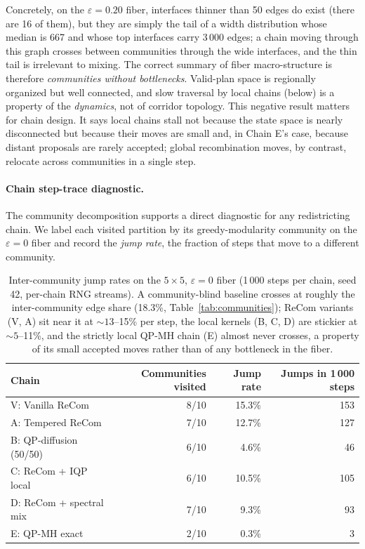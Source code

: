 \documentclass[11pt]{article}
\begin{document}
Concretely, on the $\varepsilon = 0.20$ fiber, interfaces thinner than
50 edges do exist (there are 16 of them), but they are simply the tail
of a width distribution whose median is 667 and whose top interfaces
carry $3\,000$ edges; a chain moving through this graph crosses
between communities through the wide interfaces, and the thin tail is
irrelevant to mixing. The correct summary of fiber macro-structure is
therefore \emph{communities without bottlenecks}. Valid-plan space is
regionally organized but well connected, and slow traversal by local
chains (below) is a property of the \emph{dynamics}, not of corridor
topology. This negative result matters for chain design. It says
local chains stall not because the state space is nearly disconnected
but because their moves are small and, in Chain E's case, because
distant proposals are rarely accepted; global recombination moves, by
contrast, relocate across communities in a single step.

\paragraph{Chain step-trace diagnostic.}\label{sec:fiber-trace}

The community decomposition supports a direct diagnostic for any
redistricting chain. We label each visited partition by its
greedy-modularity community on the $\varepsilon = 0$ fiber and record
the \emph{jump rate}, the fraction of steps that move to a
different community.

\begin{table}[htbp]
\centering
\small
\begin{tabular}{lrrr}
\toprule
Chain & Communities visited & Jump rate & Jumps in 1\,000 steps \\
\midrule
V: Vanilla ReCom        & 8/10 & 15.3\% & 153 \\
A: Tempered ReCom       & 7/10 & 12.7\% & 127 \\
B: QP-diffusion (50/50) & 6/10 & 4.6\%  & 46  \\
C: ReCom + IQP local    & 6/10 & 10.5\% & 105 \\
D: ReCom + spectral mix & 7/10 & 9.3\%  & 93  \\
E: QP-MH exact          & 2/10 & 0.3\%  & 3   \\
\bottomrule
\end{tabular}
\caption{Inter-community jump rates on the $5 \times 5$,
  $\varepsilon = 0$ fiber (1\,000 steps per chain, seed 42, per-chain
  RNG streams). A community-blind baseline crosses at roughly the
  inter-community edge share (18.3\%,
  Table~\ref{tab:communities}); ReCom variants (V, A) sit near it
  at $\sim 13$--15\% per step, the local kernels (B, C, D) are
  stickier at $\sim 5$--11\%, and the strictly local QP-MH chain (E)
  almost never crosses, a property of its small accepted moves rather
  than of any bottleneck in the fiber.}\label{tab:island-trace}
\end{table}
\end{document}
